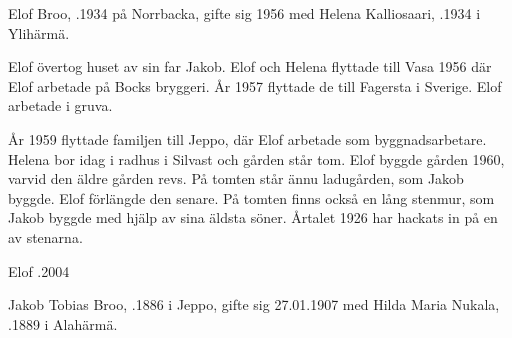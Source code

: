 %



%
Elof Broo, .1934 på Norrbacka, gifte sig 1956 med Helena Kalliosaari, .1934 i Ylihärmä.

Elof övertog huset av sin far Jakob. Elof och Helena flyttade till Vasa 1956 där Elof arbetade på Bocks bryggeri. År 1957 flyttade de till Fagersta i Sverige. Elof arbetade i gruva.
\begin{jhchildren}
  \item {}
  \item {}
  \item {}
  \item {}
\end{jhchildren}
År 1959 flyttade familjen till Jeppo, där Elof arbetade som byggnadsarbetare. Helena bor idag i radhus i Silvast och gården står tom. Elof byggde gården 1960, varvid den äldre gården revs. På tomten står ännu ladugården, som Jakob byggde. Elof förlängde den senare. På tomten finns också en lång stenmur, som Jakob byggde med hjälp av sina äldsta söner. Årtalet 1926 har hackats in på en av stenarna.

Elof .2004


%



%
Jakob Tobias Broo, .1886 i Jeppo, gifte sig 27.01.1907 med	Hilda Maria Nukala, .1889 i Alahärmä.

